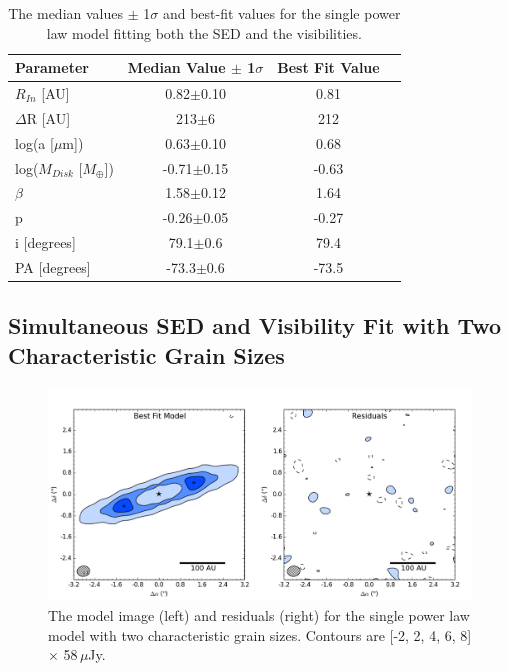 \begin{table}%
\begin{center}
    \def\arraystretch{1.10}%
    \begin{tabular}{l*{2}{c}r}
    \hline
     Parameter & Median Value $\pm$ 1$\sigma$ & Best Fit Value \\ \hline
     $R_{In}$  [AU] & 0.82$\pm$0.10 & 0.81\\ 
     $\Delta$R [AU] & 213$\pm$6} & 212 \\ 
     log(a [$\mu$m])  & 0.63$\pm$0.10 & 0.68\\ 
     log($M_{Disk}$ [$M_{\oplus}$])  & -0.71$\pm$0.15 & -0.63\\ 
     $\beta$ & 1.58$\pm$0.12 & 1.64\\ 
     p & -0.26$\pm$0.05 & -0.27\\ 
     i [degrees] & 79.1$\pm$0.6 & 79.4 \\ 
     PA [degrees] & -73.3$\pm$0.6 & -73.5\\
    \hline
    \end{tabular}
\caption{The median values $\pm$ 1$\sigma$ and best-fit values for the single power law model fitting both the SED and the visibilities.}
\label{tab:SimpleModel_Table}
\end{center}
\end{table}

\subsection{Simultaneous SED and Visibility Fit with Two Characteristic Grain Sizes}

\begin{figure}%
\centering
\includegraphics[width = 1\textwidth]{49CET_nOBAG_ModelResidual.png}
\caption{The model image (left) and residuals (right) for the single power law model with two characteristic grain sizes. Contours are [-2, 2, 4, 6, 8] $\times$ 58$\,\mu$Jy.}
\label{fig:49CET_nOBAG_ModelResidual}
\end{figure}

